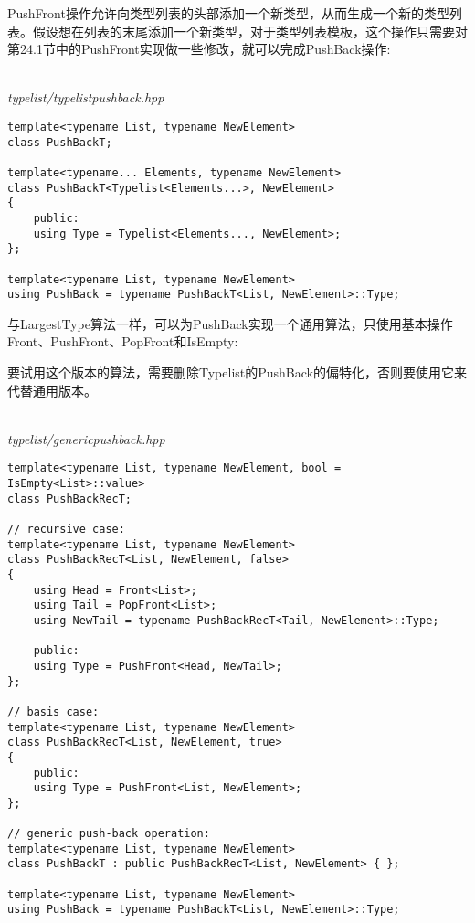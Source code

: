 
PushFront操作允许向类型列表的头部添加一个新类型，从而生成一个新的类型列表。假设想在列表的末尾添加一个新类型，对于类型列表模板，这个操作只需要对第24.1节中的PushFront实现做一些修改，就可以完成PushBack操作:

\hspace*{\fill} \\ %
\noindent
\textit{typelist/typelistpushback.hpp}
\begin{lstlisting}[style=styleCXX]
template<typename List, typename NewElement>
class PushBackT;

template<typename... Elements, typename NewElement>
class PushBackT<Typelist<Elements...>, NewElement>
{
	public:
	using Type = Typelist<Elements..., NewElement>;
};

template<typename List, typename NewElement>
using PushBack = typename PushBackT<List, NewElement>::Type;
\end{lstlisting}

与LargestType算法一样，可以为PushBack实现一个通用算法，只使用基本操作Front、PushFront、PopFront和IsEmpty:

\begin{tcolorbox}[colback=webgreen!5!white,colframe=webgreen!75!black]
\hspace*{0.75cm}要试用这个版本的算法，需要删除Typelist的PushBack的偏特化，否则要使用它来代替通用版本。
\end{tcolorbox}

\hspace*{\fill} \\ %
\noindent
\textit{typelist/genericpushback.hpp}
\begin{lstlisting}[style=styleCXX]
template<typename List, typename NewElement, bool = IsEmpty<List>::value>
class PushBackRecT;

// recursive case:
template<typename List, typename NewElement>
class PushBackRecT<List, NewElement, false>
{
	using Head = Front<List>;
	using Tail = PopFront<List>;
	using NewTail = typename PushBackRecT<Tail, NewElement>::Type;
	
	public:
	using Type = PushFront<Head, NewTail>;
};

// basis case:
template<typename List, typename NewElement>
class PushBackRecT<List, NewElement, true>
{
	public:
	using Type = PushFront<List, NewElement>;
};

// generic push-back operation:
template<typename List, typename NewElement>
class PushBackT : public PushBackRecT<List, NewElement> { };

template<typename List, typename NewElement>
using PushBack = typename PushBackT<List, NewElement>::Type;
\end{lstlisting}

